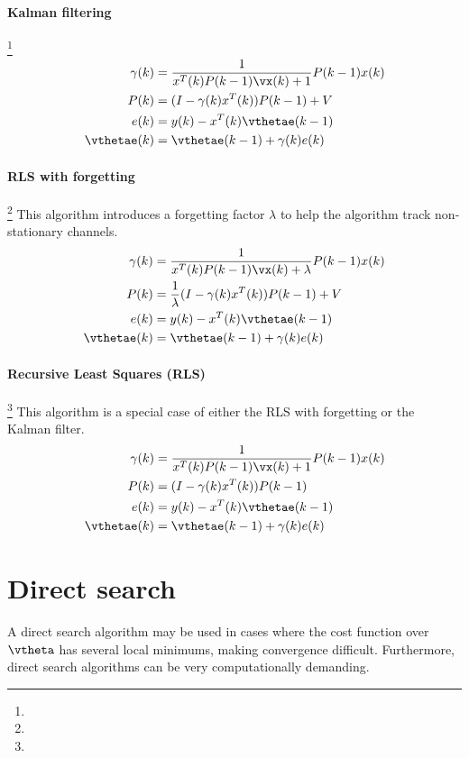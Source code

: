 \paragraph{Kalman filtering}\footnote{}
\begin{align*}
   \gamma(k) &= \frac{1}{x^T(k)P(k-1)\vx(k)+1}P(k-1)x(k) \\
   P(k) &= (I-\gamma(k)x^T(k))P(k-1)+V \\
   e(k) &= y(k) - x^T(k)\vthetae(k-1) \\
   \vthetae(k) &= \vthetae(k-1) + \gamma(k)e(k)
\end{align*}

\paragraph{RLS with forgetting}\footnote{}
This algorithm introduces a forgetting factor $\lambda$
to help the algorithm track non-stationary channels.
\begin{align*}
   \gamma(k) &= \frac{1}{x^T(k)P(k-1)\vx(k)+\lambda}  P(k-1)x(k) \\
   P(k) &= \frac{1}{\lambda}(I-\gamma(k)x^T(k))P(k-1)+V \\
   e(k) &= y(k) - x^T(k)\vthetae(k-1) \\
   \vthetae(k) &= \vthetae(k-1) + \gamma(k)e(k)
\end{align*}
\fi

\paragraph{Recursive Least Squares (RLS)}\footnote{}
This algorithm is a special case of either the RLS with forgetting
or the Kalman filter.
\begin{align*}
   \gamma(k) &= \frac{1}{x^T(k)P(k-1)\vx(k)+1}  P(k-1)x(k) \\
   P(k) &= (I-\gamma(k)x^T(k))P(k-1) \\
   e(k) &= y(k) - x^T(k)\vthetae(k-1) \\
   \vthetae(k) &= \vthetae(k-1) + \gamma(k)e(k)
\end{align*}




\section{Direct search}
A direct search algorithm may be used in cases where the cost
function over $\vtheta$ has several local minimums, making convergence difficult.
Furthermore, direct search algorithms can be very computationally demanding.

